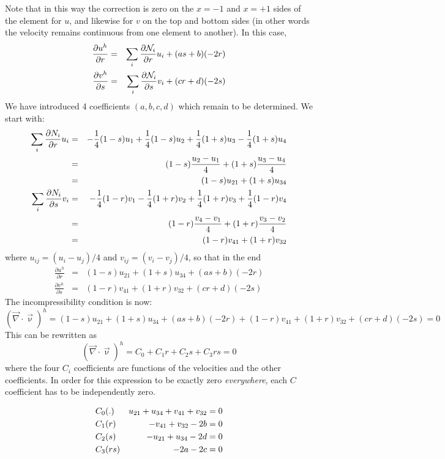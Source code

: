 Note that in this way the correction is zero on the $x=-1$ and $x=+1$ sides 
of the element for $u$, and likewise for $v$ on the top and bottom sides (in 
other words the velocity remains continuous from one element to another).
In this case,
\begin{eqnarray}
\frac{\partial u^h}{\partial r}&=&\sum_i \frac{\partial {\mathcal{N}}_i}{\partial r} u_i + (a s + b) (-2r) \nonumber\\
\frac{\partial v^h}{\partial s}&=&\sum_i \frac{\partial {\mathcal{N}}_i}{\partial s} v_i + (c r + d)(-2s) \nonumber
\end{eqnarray}
We have introduced 4 coefficients  $(a,b,c,d)$ which remain to be determined. 
We start with:
\begin{eqnarray}
\sum_i \frac{\partial N_i}{\partial r} u_i 
&=& -\frac{1}{4} (1-s) u_1 + \frac{1}{4} (1-s) u_2 +\frac{1}{4} (1+s) u_3 -\frac{1}{4} (1+s) u_4 \nonumber\\
&=& (1-s) \frac{u_2-u_1}{4} + (1+s) \frac{u_3-u_4}{4} \nonumber\\
&=& (1-s) u_{21} + (1+s) u_{34} \nonumber\\
\sum_i \frac{\partial N_i}{\partial s} v_i 
&=& -\frac{1}{4} (1-r) v_1 - \frac{1}{4} (1+r) v_2 +\frac{1}{4} (1+r) v_3 +\frac{1}{4} (1-r) v_4 \nonumber\\
&=& (1-r) \frac{v_4-v_1}{4} + (1+r)\frac{v_3-v_2}{4} \nonumber\\
&=& (1-r) v_{41} + (1+r) v_{32} \nonumber
\end{eqnarray}
where $u_{ij}=(u_i-u_j)/4$ and $v_{ij}=(v_i-v_j)/4$, so that in the end
\begin{eqnarray}
\frac{\partial u^h}{\partial r} &=& (1-s) u_{21} + (1+s) u_{34} + (a s + b)(-2r) \\
\frac{\partial v^h}{\partial s} &=& (1-r) v_{41} + (1+r) v_{32} + (c r + d)(-2s)
\end{eqnarray}
The incompressibility condition is now:
\[
(\vec\nabla\cdot\vec\upnu)^h =
(1-s) u_{21} + (1+s) u_{34} 
+ (a s + b) (-2r) +
(1-r) v_{41} + (1+r) v_{32}
+ (c r + d)(-2s)
=0
\]
This can be rewritten as
\[
(\vec\nabla\cdot\vec\upnu)^h =
C_0  + C_1 r + C_2 s + C_3 rs = 0
\]
where the four $C_i$ coefficients are functions of the velocities and the other coefficients.
In order for this expression to be exactly zero {\it everywhere}, each $C$ coefficient has
to be independently zero.

\begin{eqnarray}
C_0   &(.)  &  u_{21} + u_{34} + v_{41} + v_{32} =0\nonumber\\ 
C_1   &(r)  &  -v_{41} + v_{32} -2b =0\nonumber\\ 
C_2   &(s)  &  -u_{21} + u_{34} -2d =0 \nonumber\\ 
C_3   &(rs) &  -2a -2c =0\nonumber 
\end{eqnarray}

